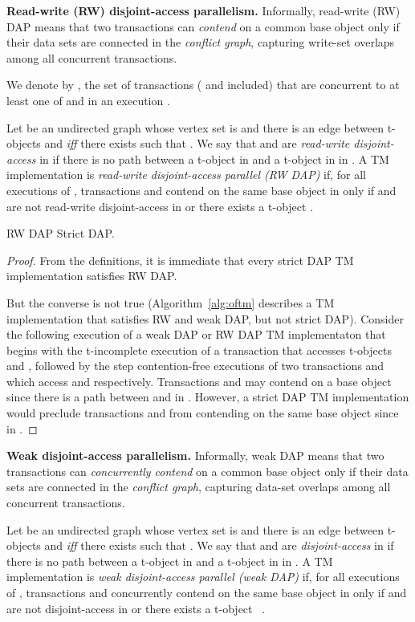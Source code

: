 \vspace{1mm}\noindent\textbf{Read-write (RW) disjoint-access parallelism.}
Informally, read-write (RW) DAP means that two transactions
can \emph{contend}  
on a common base object only if their data 
sets are connected in the \emph{conflict graph}, capturing 
write-set overlaps among all concurrent transactions.

We denote by , the set of transactions ( and  included)
that are concurrent to at least one of  and  in an execution .

Let  be an undirected graph whose vertex set is 
and there is an edge
between t-objects  and  \emph{iff} there exists  such that 
.
We say that  and  are \emph{read-write disjoint-access} in 
if there is no path between a t-object in  and a t-object in  in .
A TM implementation  is \emph{read-write disjoint-access parallel (RW DAP)} if, for
all executions  of , 
transactions  and  
contend on the same base object in  only if   
 and  are not read-write disjoint-access in  or there exists a t-object .
\begin{proposition}
RW DAP  Strict DAP.
\end{proposition}
\begin{proof}
From the definitions, it is immediate that every strict DAP TM implementation satisfies RW DAP.

But the converse is not true (Algorithm~\ref{alg:oftm} describes a TM implementation that satisfies RW and weak DAP, but not strict DAP).
Consider the following execution  of a weak DAP or RW DAP TM implementaton  
that begins with the t-incomplete execution of a transaction  that 
accesses t-objects  and , followed by the step contention-free executions of two transactions  and  
which access  and  respectively. Transactions  and  may contend on a base object since 
there is a path between  and  in . However, a strict DAP TM implementation
would preclude transactions  and  from contending on the same base object since 
in .
\end{proof}
\vspace{1mm}\noindent\textbf{Weak disjoint-access parallelism.}
Informally, weak DAP means that two transactions
can \emph{concurrently contend}  
on a common base object only if their data 
sets are connected in the \emph{conflict graph}, capturing 
data-set overlaps among all concurrent transactions.

Let  be an undirected graph whose vertex set is 
and there is an edge
between t-objects  and  \emph{iff} there exists  such that 
.
We say that  and  are \emph{disjoint-access} in 
if there is no path between a t-object in  and a t-object in  in .
A TM implementation  is \emph{weak disjoint-access parallel (weak DAP)} if, for
all executions  of ,
transactions  and  
concurrently contend on the same base object in  only if   
 and  are not disjoint-access in  or there exists a t-object ~\cite{AHM09,PFK10}.

